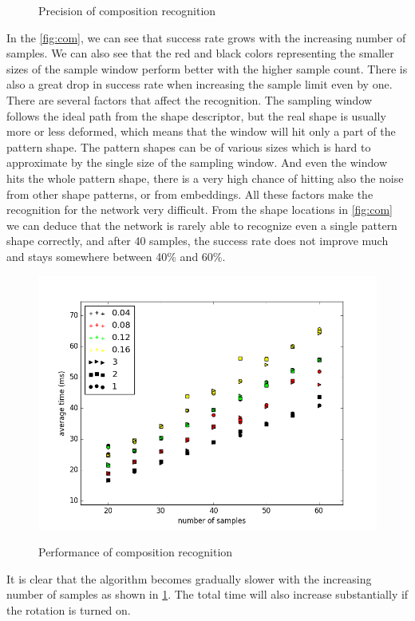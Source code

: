 \begin{description}
\begin{figure}[!htb]
\begin{center}
\end{center}
    \centering
    \caption{Precision of composition recognition}
\end{figure}
In the \ref{fig:com}, we can see that success rate grows with the increasing number of samples. We can also see that the red and black colors representing the smaller sizes of the sample window perform better with the higher sample count. There is also a great drop in success rate when increasing the sample limit even by one. There are several factors that affect the recognition. The sampling window follows the ideal path from the shape descriptor, but the real shape is usually more or less deformed, which means that the window will hit only a part of the pattern shape. The pattern shapes can be of various sizes which is hard to approximate by the single size of the sampling window. And even the window hits the whole pattern shape, there is a very high chance of hitting also the noise from other shape patterns, or from embeddings. All these factors make the recognition for the network very difficult. From the shape locations in \ref{fig:com} we can deduce that the network is rarely able to recognize even a single pattern shape correctly, and after 40 samples, the success rate does not improve much and stays somewhere between 40\% and 60\%.

\begin{figure}[!htb]
\begin{center}
\label{fig:com_speed}
\includegraphics[width=\linewidth]{ext/figure_composition_speed.png}
\end{center}
    \centering
    \caption{Performance of composition recognition}
\end{figure}
It is clear that the algorithm becomes gradually slower with the increasing number of samples as shown in \ref{fig:com_speed}. The total time will also increase substantially if the rotation is turned on.


\end{description}

